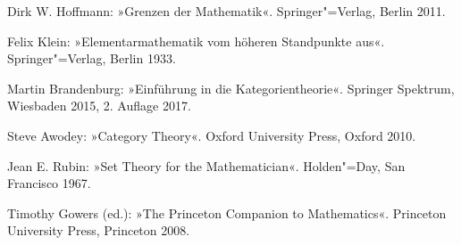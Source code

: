 
\begin{thebibliography}{00}

Dirk W. Hoffmann: »Grenzen der Mathematik«.
Springer"=Verlag, Berlin 2011.

Felix Klein: »Elementarmathematik vom höheren Standpunkte aus«.\\
Springer"=Verlag, Berlin 1933.

Martin Brandenburg: »Einführung in die Kategorientheorie«.
Springer Spektrum, Wiesbaden 2015, 2. Auflage 2017.

Steve Awodey: »Category Theory«. Oxford University Press, Oxford 2010.

Jean E. Rubin: »Set Theory for the Mathematician«.
Holden"=Day, San Francisco 1967.

Timothy Gowers (ed.): »The Princeton Companion to Mathematics«.
Princeton University Press, Princeton 2008.

\end{thebibliography}
